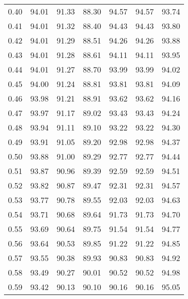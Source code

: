 \begin{tabular}{|c|c|c|c|c|c|c|}
      0.40 &     94.01 &     91.33 &      88.30 &   94.57 &      94.57 &         93.74 \\
      0.41 &     94.01 &     91.32 &      88.40 &   94.43 &      94.43 &         93.80 \\
      0.42 &     94.01 &     91.29 &      88.51 &   94.26 &      94.26 &         93.88 \\
      0.43 &     94.01 &     91.28 &      88.61 &   94.11 &      94.11 &         93.95 \\
      0.44 &     94.01 &     91.27 &      88.70 &   93.99 &      93.99 &         94.02 \\
      0.45 &     94.00 &     91.24 &      88.81 &   93.81 &      93.81 &         94.09 \\
      0.46 &     93.98 &     91.21 &      88.91 &   93.62 &      93.62 &         94.16 \\
      0.47 &     93.97 &     91.17 &      89.02 &   93.43 &      93.43 &         94.24 \\
      0.48 &     93.94 &     91.11 &      89.10 &   93.22 &      93.22 &         94.30 \\
      0.49 &     93.91 &     91.05 &      89.20 &   92.98 &      92.98 &         94.37 \\
      0.50 &     93.88 &     91.00 &      89.29 &   92.77 &      92.77 &         94.44 \\
      0.51 &     93.87 &     90.96 &      89.39 &   92.59 &      92.59 &         94.51 \\
      0.52 &     93.82 &     90.87 &      89.47 &   92.31 &      92.31 &         94.57 \\
      0.53 &     93.77 &     90.78 &      89.55 &   92.03 &      92.03 &         94.63 \\
      0.54 &     93.71 &     90.68 &      89.64 &   91.73 &      91.73 &         94.70 \\
      0.55 &     93.69 &     90.64 &      89.75 &   91.54 &      91.54 &         94.77 \\
      0.56 &     93.64 &     90.53 &      89.85 &   91.22 &      91.22 &         94.85 \\
      0.57 &     93.55 &     90.38 &      89.93 &   90.83 &      90.83 &         94.92 \\
      0.58 &     93.49 &     90.27 &      90.01 &   90.52 &      90.52 &         94.98 \\
      0.59 &     93.42 &     90.13 &      90.10 &   90.16 &      90.16 &         95.05 \\

\end{tabular}

